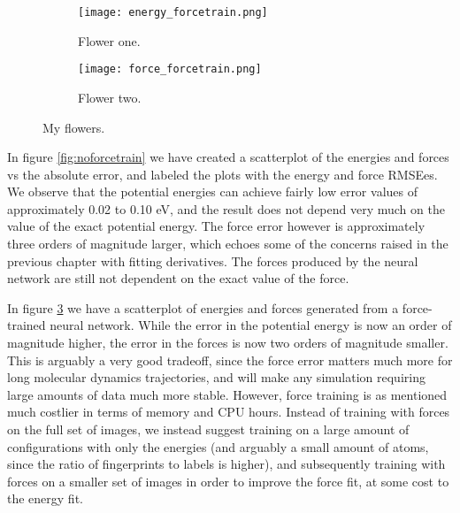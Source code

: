 \begin{figure}[!tbp]
\begin{adjustbox}{max width=1.2\linewidth,center}
\centering
  \begin{subfigure}[b]{0.55\textwidth}
      \texttt{[image: energy\_forcetrain.png]}
    \caption{Flower one.}
    \label{fig:f1}
  \end{subfigure}
  \hfill
  \begin{subfigure}[b]{0.55\textwidth}
      \texttt{[image: force\_forcetrain.png]}
    \caption{Flower two.}
    \label{fig:f2}
  \end{subfigure}
\end{adjustbox}
\caption{My flowers.}
    \label{fig:forcetrain}
\end{figure}

In figure \ref{fig:noforcetrain} we have created a scatterplot
of the energies and forces vs the absolute error, and labeled
the plots with the energy and force RMSEes.
We observe that the potential energies can achieve fairly
low error values of approximately 0.02 to 0.10 eV, and the
result does not depend very much on the value of the exact potential
energy.
The force error however is approximately three orders of magnitude
larger, which echoes some of the concerns raised in the previous
chapter with fitting derivatives. The forces produced by the neural
network are still not dependent on the exact value of the force.
\par
In figure \ref{fig:forcetrain} we have a scatterplot of energies
and forces generated from a force-trained neural network.
While the error in the potential energy is now an order of magnitude higher,
the error in the forces is now two orders of magnitude smaller.
This is arguably a very good tradeoff, since the force error matters
much more for long molecular dynamics trajectories, and will make
any simulation requiring large amounts of data much more stable.
However, force training is as mentioned much costlier in terms
of memory and CPU hours. Instead of training with forces on the full
set of images, we instead suggest training on a large amount of configurations
with only the energies (and arguably a small amount of atoms, since
the ratio of fingerprints to labels is higher), and subsequently training
with forces on a smaller set of images in order to improve the force fit,
at some cost to the energy fit.

